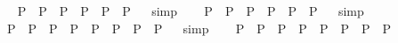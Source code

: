 \begin{isabellebody}
\isamarkuptrue%
\ \isamarkupfalse%
\ {\isachardoublequoteopen}{\isasymphi}\isactrlsup P\ \isactrlbold {\isasymand}\ {\isasympsi}\isactrlsup P\ \isactrlbold {\isasymrightarrow}\ {\isasymchi}\isactrlsup P\ {\isasymequiv}\ {\isacharparenleft}{\isasymphi}\isactrlsup P\ \isactrlbold {\isasymand}\ {\isasympsi}\isactrlsup P{\isacharparenright}\ \isactrlbold {\isasymrightarrow}\ {\isasymchi}\isactrlsup P{\isachardoublequoteclose}%
\isadelimproof
\ %
\endisadelimproof
%
\isatagproof
{}\isamarkupfalse%
\ simp\ \isamarkupfalse%
%
\endisatagproof
{\isafoldproof}%
%
\isadelimproof
%
\endisadelimproof
\isanewline
\ \isamarkupfalse%
\ {\isachardoublequoteopen}{\isasymphi}\isactrlsup P\ \isactrlbold {\isasymand}\ {\isasympsi}\isactrlsup P\ \isactrlbold {\isasymrightarrow}\ {\isasymchi}\isactrlsup P\ {\isasymequiv}\ {\isasymphi}\isactrlsup P\ \isactrlbold {\isasymand}\ {\isacharparenleft}{\isasympsi}\isactrlsup P\ \isactrlbold {\isasymrightarrow}\ {\isasymchi}\isactrlsup P{\isacharparenright}{\isachardoublequoteclose}%
\isadelimproof
\ %
\endisadelimproof
%
\isatagproof
{}\isamarkupfalse%
\ simp%
\endisatagproof
{\isafoldproof}%
%
\isadelimproof
%
\endisadelimproof
\ \isamarkupfalse%
%
\isadelimproof
\ %
\endisadelimproof
%
\isatagproof
{}\isamarkupfalse%
\ %
%
\endisatagproof
{\isafoldproof}%
%
\isadelimproof
%
\endisadelimproof
\isanewline
\isanewline
\ \isamarkupfalse%
\ {\isachardoublequoteopen}{\isacharparenleft}{\isasymphi}\isactrlsup P\ \isactrlbold {\isasymand}\ {\isasympsi}\isactrlsup P\ \isactrlbold {\isasymequiv}\ {\isasymphi}\isactrlsup P\ \isactrlbold {\isasymand}\ {\isasympsi}\isactrlsup P{\isacharparenright}\ {\isasymequiv}\ {\isacharparenleft}{\isacharparenleft}{\isasymphi}\isactrlsup P\ \isactrlbold {\isasymand}\ {\isasympsi}\isactrlsup P{\isacharparenright}\ \isactrlbold {\isasymequiv}\ {\isacharparenleft}{\isasymphi}\isactrlsup P\ \isactrlbold {\isasymand}\ {\isasympsi}\isactrlsup P{\isacharparenright}{\isacharparenright}{\isachardoublequoteclose}%
\isadelimproof
\ %
\endisadelimproof
%
\isatagproof
{}\isamarkupfalse%
\ simp\ \isamarkupfalse%
%
\endisatagproof
{\isafoldproof}%
%
\isadelimproof
%
\endisadelimproof
\isanewline
\ \isamarkupfalse%
\ {\isachardoublequoteopen}{\isacharparenleft}{\isasymphi}\isactrlsup P\ \isactrlbold {\isasymand}\ {\isasympsi}\isactrlsup P\ \isactrlbold {\isasymequiv}\ {\isasymphi}\isactrlsup P\ \isactrlbold {\isasymand}\ {\isasympsi}\isactrlsup P{\isacharparenright}\ {\isasymequiv}\ {\isacharparenleft}{\isasymphi}\isactrlsup P\ \isactrlbold {\isasymand}\ {\isacharparenleft}{\isasympsi}\isactrlsup P\ \isactrlbold {\isasymequiv}\ {\isasymphi}\isactrlsup P{\isacharparenright}\ \isactrlbold {\isasymand}\ {\isasympsi}\isactrlsup P{\isacharparenright}{\isachardoublequoteclose}%

\end{isabellebody}
